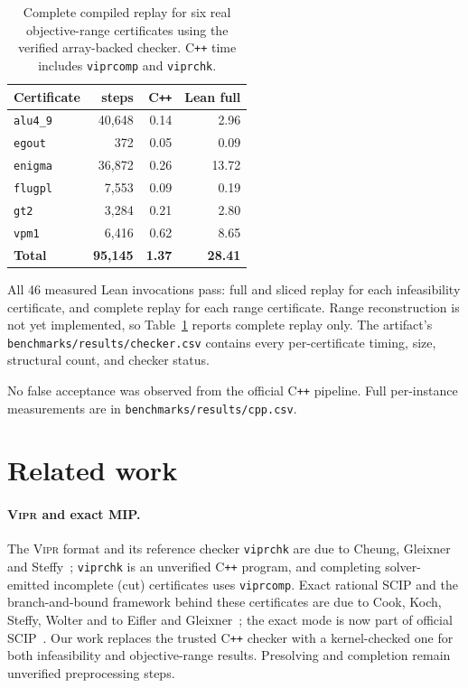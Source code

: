 \documentclass[runningheads]{llncs}
\newcommand{\code}[1]{\texttt{#1}}
\newcommand{\scip}{\textsc{SCIP}}
\newcommand{\vipr}{\textsc{Vipr}}
\begin{document}
\begin{table}[t]
\centering
\caption{Complete compiled replay for six real objective-range certificates using
the verified array-backed checker. C\texttt{++} time includes \code{viprcomp}
and \code{viprchk}.}
\label{tab:range-time}
\small
\setlength{\tabcolsep}{9pt}
\begin{tabular}{lrrr}
\toprule
Certificate & steps & C\texttt{++} & Lean full \\
\midrule
\code{alu4\_9} & 40,648 & 0.14 & 2.96 \\
\code{egout} & 372 & 0.05 & 0.09 \\
\code{enigma} & 36,872 & 0.26 & 13.72 \\
\code{flugpl} & 7,553 & 0.09 & 0.19 \\
\code{gt2} & 3,284 & 0.21 & 2.80 \\
\code{vpm1} & 6,416 & 0.62 & 8.65 \\
\midrule
\textbf{Total} & \textbf{95,145} & \textbf{1.37} & \textbf{28.41} \\
\bottomrule
\end{tabular}
\end{table}

All 46 measured Lean invocations pass: full and sliced replay for each infeasibility
certificate, and complete replay for each range certificate. Range reconstruction is
not yet implemented, so Table~\ref{tab:range-time} reports complete replay only. The
artifact's \code{benchmarks/results/checker.csv} contains every
per-certificate timing, size, structural count, and checker status.

No false acceptance was observed from the official C\texttt{++} pipeline. Full
per-instance measurements are in \code{benchmarks/results/cpp.csv}.

\section{Related work}\label{sec:related}

\paragraph{\vipr{} and exact MIP.} The \vipr{} format and its reference checker
\code{viprchk} are due to Cheung, Gleixner and Steffy~\cite{vipr}; \code{viprchk} is an
unverified C\texttt{++} program, and completing solver-emitted incomplete (cut)
certificates uses \code{viprcomp}. Exact rational \scip{} and the branch-and-bound
framework behind these certificates are due to Cook, Koch, Steffy, Wolter and to Eifler
and Gleixner~\cite{eifler}; the exact mode is now part of official
\scip~\cite{scip}. Our work replaces the trusted C\texttt{++} checker with a
kernel-checked one for both infeasibility and objective-range results. Presolving and
completion remain unverified preprocessing steps.
\end{document}
